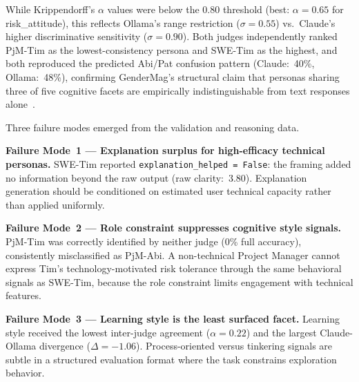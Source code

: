 \documentclass[sigconf,review]{acmart}
\begin{document}
While Krippendorff's $\alpha$ values were below the 0.80 threshold
(best: $\alpha=0.65$ for risk\_attitude), this reflects Ollama's range
restriction ($\sigma=0.55$) vs.\ Claude's higher discriminative
sensitivity ($\sigma=0.90$). Both judges independently ranked PjM-Tim as
the lowest-consistency persona and SWE-Tim as the highest, and both
reproduced the predicted Abi/Pat confusion pattern (Claude:~40\%,
Ollama:~48\%), confirming GenderMag's structural claim that personas
sharing three of five cognitive facets are empirically indistinguishable
from text responses alone~\cite{burnett2016gendermag}.

Three failure modes emerged from the validation and reasoning data.

\textbf{Failure Mode~1 --- Explanation surplus for high-efficacy
technical personas.} SWE-Tim reported \texttt{explanation\_helped =
False}: the framing added no information beyond the raw output (raw
clarity:~3.80). Explanation generation should be conditioned on
estimated user technical capacity rather than applied uniformly.

\textbf{Failure Mode~2 --- Role constraint suppresses cognitive style
signals.} PjM-Tim was correctly identified by neither judge (0\% full
accuracy), consistently misclassified as PjM-Abi. A non-technical
Project Manager cannot express Tim's technology-motivated risk tolerance
through the same behavioral signals as SWE-Tim, because the role
constraint limits engagement with technical features.

\textbf{Failure Mode~3 --- Learning style is the least surfaced facet.}
Learning style received the lowest inter-judge agreement ($\alpha=0.22$)
and the largest Claude-Ollama divergence ($\Delta=-1.06$).
Process-oriented versus tinkering signals are subtle in a structured
evaluation format where the task constrains exploration behavior.




\end{document}
